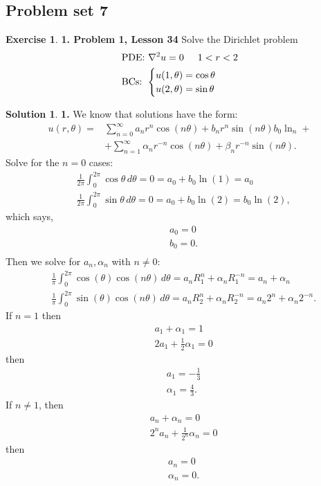 \documentclass{article}
\theoremstyle{definition}
\newtheorem*{exer*}{Exercise}
\newtheorem*{sln*}{Solution}
\newcommand{\f}[2]{\frac{#1}{#2}}
\begin{document}
\newpage
\subsection{Problem set 7}



\begin{exer*}\textbf{1. Problem 1, Lesson 34} 
	Solve the Dirichlet problem
	\begin{align*}
	&\text{PDE: } \laplacian u = 0 \hspace{0.5cm} 1 < r < 2\\
	&\text{BCs: }
	\begin{cases}
	 u(1,\theta) = \cos\theta\\
	 u(2,\theta) = \sin\theta
	\end{cases}
	\end{align*}
	
	\begin{sln*}\textbf{1.} 
		We know that solutions have the form:
		\begin{align*}
		u(r,\theta) =& \sum^\infty_{n=0} a_n r^n \cos(n\theta) + b_n r^{n}\sin(n\theta) b_0\ln_n +\\
		&+\sum^\infty_{n=1}\alpha_n r^{-n}\cos(n\theta) + \beta_n r^{-n}\sin(n\theta). 
		\end{align*}
		Solve for the $n=0$ cases:
		\begin{align*}
		&\f{1}{2\pi}\int^{2\pi}_0 \cos\theta\,d\theta = 0 = a_0 + b_0 \ln(1) = a_0\\
		&\f{1}{2\pi}\int^{2\pi}_0 \sin\theta\,d\theta = 0 = a_0 + b_0 \ln(2) = b_0 \ln(2),
		\end{align*}
		which says,
		\begin{align*}
		&a_0 = 0\\
		&b_0 = 0.\\
		\end{align*}
		Then we solve for $a_n, \alpha_n$ with $n\neq 0$:
		\begin{align*}
		&\f{1}{\pi}\int^{2\pi}_0 \cos(\theta)\cos(n\theta)\,d\theta = a_n R_1^n + \alpha_n R_1^{-n} = a_n + \alpha_n\\
		&\f{1}{\pi}\int^{2\pi}_0 \sin(\theta)\cos(n\theta)\,d\theta = a_n R_2^n + \alpha_n R_2^{-n} = a_n 2^n + \alpha_n 2^{-n}.
		\end{align*}
		If $n=1$ then
		\begin{align*}
		& a_1 + \alpha_1 = 1\\
		& 2a_1 + \frac{1}{2}\alpha_1 = 0
		\end{align*}
		then 
		\begin{align*}
		&a_1 = -\frac{1}{3}\\
		&\alpha_1 = \frac{4}{3}.
		\end{align*}
		If $n\neq 1$, then 
		\begin{align*}
		& a_n + \alpha_n = 0\\
		& 2^n a_n + \frac{1}{2^n}\alpha_n = 0
		\end{align*}
		then 
		\begin{align*}
		&a_n = 0\\
		&\alpha_n = 0.
		\end{align*}
		

\end{sln*}
\end{exer*}
\end{document}
